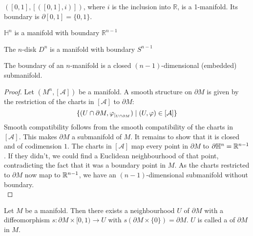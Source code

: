 \documentclass[a4paper,12pt]{article}
\begin{document}
\begin{example}
    \(([0,1],[([0,1],i)])\), where \(i\) is the inclusion into \(\mathbb{R}\), is a 1-manifold. Its boundary is \(\partial [0,1]=\{0,1\}\).
\end{example}

\begin{example}
    \(\mathbb{H}^n\) is a manifold with boundary \(\mathbb{R}^{n-1}\)
\end{example}

\begin{example}
    The \(n\)-disk \(D^n\) is a manifold with boundary \(S^{n-1}\)
\end{example}

\begin{theorem}\label{boundary manifold}
    The boundary of an \(n\)-manifold is a closed \((n-1)\)-dimensional (embedded) submanifold.
\end{theorem}

\begin{proof}
    Let \((M^n,[\mathcal{A}])\) be a manifold. A smooth structure on \(\partial M\) is given by the restriction of the charts in \([\mathcal{A}]\) to \(\partial M\): \[\{(U\cap\partial M,\varphi_{|_{U\cap\partial M}})\mid (U,\varphi)\in[\mathcal{A}]\}\]
    Smooth compatibility follows from the smooth compatibility of the charts in \([\mathcal{A}]\). This makes \(\partial M\) a submanifold of \(M\). It remains to show that it is closed and of codimension \(1\). The charts in \([\mathcal{A}]\) map every point in \(\partial M\) to \(\partial\mathbb{H}^n=\mathbb{R}^{n-1}\). If they didn't, we could find a Euclidean neighbourhood of that point, contradicting the fact that it was a boundary point in \(M\). As the charts restricted to \(\partial M\) now map to \(\mathbb{R}^{n-1}\), we have an \((n-1)\)-dimensional submanifold without boundary.\\
\end{proof}

\begin{theorem}\label{collar}
    Let \(M\) be a manifold. Then there exists a neighbourhood \(U\) of \(\partial M\) with a diffeomorphism \(s:\partial M\times [0,1)\to U\) with \(s(\partial M\times\{0\})=\partial M\). \(U\) is called a  of \(\partial M\) in \(M\).
\end{theorem}
\end{document}
